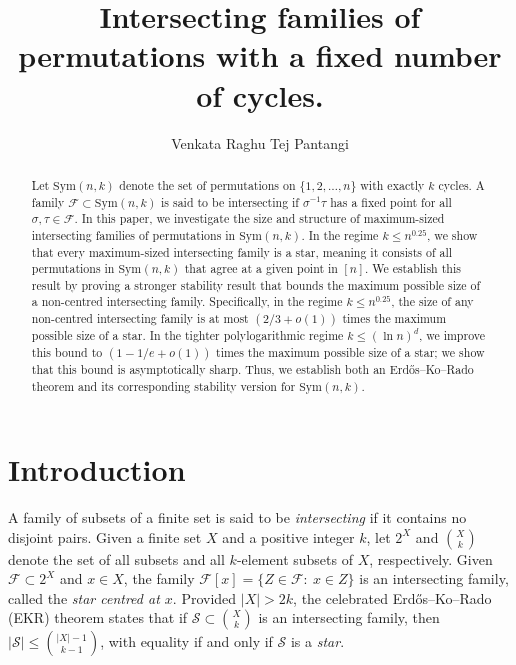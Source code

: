 \documentclass{amsart}
\title{Intersecting families of permutations with a fixed number of cycles.}
\author{Venkata Raghu Tej Pantangi}
\newcommand{\mcal}{\mathcal}
\newcommand{\sym}{\mathrm{Sym}}
\begin{document}
\begin{abstract}
Let $\sym(n,k)$ denote the set of permutations on $\{1,2,\ldots,n\}$ with exactly $k$ cycles. A family $\mcal{F}\subset\sym(n,k)$ is said to be intersecting if $\sigma^{-1}\tau$ has a fixed point for all $\sigma,\tau\in\mcal{F}$. In this paper, we investigate the size and structure of maximum-sized intersecting families of permutations in $\sym(n,k)$. In the regime $k\leq n^{0.25}$, we show that every maximum-sized intersecting family is a star, meaning it consists of all permutations in $\sym(n,k)$ that agree at a given point in $[n]$. We establish this result by proving a stronger stability result that bounds the maximum possible size of a non-centred intersecting family. Specifically, in the regime $k\leq n^{0.25}$, the size of any non-centred intersecting family is at most $\left(2/3+o(1)\right)$ times the maximum possible size of a star. In the tighter polylogarithmic regime $k\leq (\ln n)^{d}$, we improve this bound to $\left(1-1/e+o(1)\right)$ times the maximum possible size of a star; we show that this bound is asymptotically sharp. Thus, we establish both an Erd\H{o}s--Ko--Rado theorem and its corresponding stability version for $\sym(n,k)$.
\end{abstract}
\maketitle 
\section{Introduction}
A family of subsets of a finite set is said to be {\it intersecting} if it contains no disjoint pairs. Given a finite set $X$ and a positive integer $k$, let $2^{X}$ and $\binom{X}{k}$ denote the set of all subsets and all $k$-element subsets of $X$, respectively. Given $\mcal{F}\subset 2^{X}$ and  $x\in X$, the family $\mcal{F}[x]=\{Z\in \mcal{F}\colon\ x\in Z\}$ is an intersecting family, called the {\it star centred at $x$}.
Provided $|X|>2k$, the celebrated Erd\H{o}s--Ko--Rado (EKR) theorem \cite{EKR1961} states that if $\mcal{S} \subset \binom{X}{k}$ is an intersecting family, then $|\mcal{S}|\leq \binom{|X|-1}{k-1}$, with equality if and only if $\mcal{S}$ is a {\it star}.  
\end{document}
